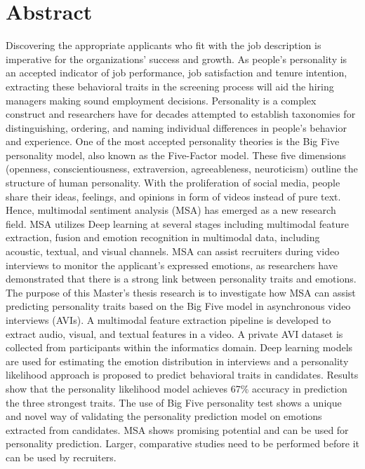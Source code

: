 \chapter*{Abstract}
Discovering the appropriate applicants who fit with the job description is imperative for the organizations' success and growth. As people's personality is an accepted indicator of job performance, job satisfaction and tenure intention, extracting these behavioral traits in the screening process will aid the hiring managers making sound employment decisions. Personality is a complex construct and researchers have for decades attempted to establish taxonomies for distinguishing, ordering, and naming individual differences in people's behavior and experience. One of the most accepted personality theories is the Big Five personality model, also known as the Five-Factor model. These five dimensions (openness, conscientiousness, extraversion, agreeableness, neuroticism) outline the structure of human personality. With the proliferation of social media, people share their ideas, feelings, and opinions in form of videos instead of pure text. Hence, multimodal sentiment analysis (MSA) has emerged as a new research field. MSA utilizes Deep learning at several stages including multimodal feature extraction, fusion and emotion recognition in multimodal data, including acoustic, textual, and visual channels. MSA can assist recruiters during video interviews to monitor the applicant's expressed emotions, as researchers have demonstrated that there is a strong link between personality traits and emotions. The purpose of this Master's thesis research is to investigate how MSA can assist predicting personality traits based on the Big Five model in asynchronous video interviews (AVIs). A multimodal feature extraction pipeline is developed to extract audio, visual, and textual features in a video. A private AVI dataset is collected from participants within the informatics domain. Deep learning models are used for estimating the emotion distribution in interviews and a personality likelihood approach is proposed to predict behavioral traits in candidates. Results show that the personality likelihood model achieves 67\% accuracy in prediction the three strongest traits. The use of Big Five personality test shows a unique and novel way of validating the personality prediction model on emotions extracted from candidates. MSA shows promising potential and can be used for personality prediction. Larger, comparative studies need to be performed before it can be used by recruiters.  


